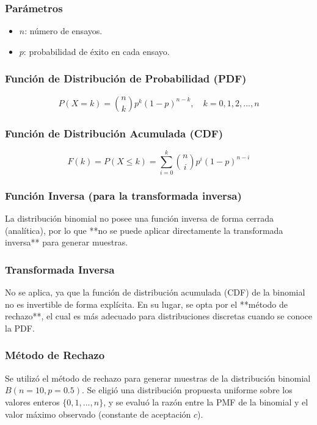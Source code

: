 \documentclass{article}
\begin{document}
\subsubsection*{Parámetros}
\begin{itemize}
  \item $n$: número de ensayos.
  \item $p$: probabilidad de éxito en cada ensayo.
\end{itemize}

\subsubsection*{Función de Distribución de Probabilidad (PDF)}
\[
P(X = k) = \binom{n}{k} p^k (1-p)^{n-k}, \quad k = 0, 1, 2, ..., n
\]

\subsubsection*{Función de Distribución Acumulada (CDF)}
\[
F(k) = P(X \leq k) = \sum_{i=0}^k \binom{n}{i} p^i (1-p)^{n-i}
\]

\subsubsection*{Función Inversa (para la transformada inversa)}
La distribución binomial no posee una función inversa de forma cerrada (analítica), por lo que **no se puede aplicar directamente la transformada inversa** para generar muestras.

\vspace{0.5em}
\subsubsection{Transformada Inversa}
No se aplica, ya que la función de distribución acumulada (CDF) de la binomial no es invertible de forma explícita. En su lugar, se opta por el **método de rechazo**, el cual es más adecuado para distribuciones discretas cuando se conoce la PDF.

\vspace{0.5em}
\subsubsection{Método de Rechazo}
Se utilizó el método de rechazo para generar muestras de la distribución binomial $B(n=10, p=0.5)$. Se eligió una distribución propuesta uniforme sobre los valores enteros $\{0, 1, ..., n\}$, y se evaluó la razón entre la PMF de la binomial y el valor máximo observado (constante de aceptación $c$).
\end{document}

